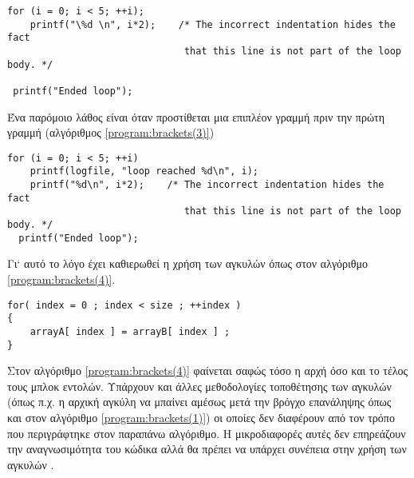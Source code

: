 \begin{lstlisting}[style=cpp, caption= Αγκύλες (2), label=program:brackets(2)]
 for (i = 0; i < 5; ++i);
    printf("\%d \n", i*2);    /* The incorrect indentation hides the fact 
                               that this line is not part of the loop body. */

 printf("Ended loop");
\end{lstlisting}

 
Ένα παρόμοιο λάθος είναι όταν προστίθεται μια επιπλέον γραμμή πριν την πρώτη γραμμή (αλγόριθμος \ref{program:brackets(3)})

\begin{lstlisting}[style=cpp, caption= Αγκύλες (3), label=program:brackets(3)]
 for (i = 0; i < 5; ++i)
    printf(logfile, "loop reached %d\n", i);
    printf("%d\n", i*2);    /* The incorrect indentation hides the fact 
                               that this line is not part of the loop body. */
  printf("Ended loop");
\end{lstlisting}

Γι` αυτό το λόγο έχει καθιερωθεί η χρήση των αγκυλών όπως στον αλγόριθμο \ref{program:brackets(4)}.

\begin{lstlisting}[style=cpp, caption= Αγκύλες (4), label=program:brackets(4)]
for( index = 0 ; index < size ; ++index )
{
    arrayA[ index ] = arrayB[ index ] ;
}
\end{lstlisting}

Στον αλγόριθμο \ref{program:brackets(4)} φαίνεται σαφώς τόσο η αρχή όσο και το τέλος τους μπλοκ εντολών. Υπάρχουν και άλλες μεθοδολογίες τοποθέτησης των αγκυλών (όπως π.χ. η αρχική αγκύλη να μπαίνει αμέσως μετά την βρόγχο επανάληψης όπως και στον αλγόριθμο \ref{program:brackets(1)}) οι οποίες δεν διαφέρουν από τον τρόπο που περιγράφτηκε στον παραπάνω αλγόριθμο. Η μικροδιαφορές αυτές δεν επηρεάζουν την αναγνωσιμότητα του κώδικα αλλά θα πρέπει να υπάρχει συνέπεια στην χρήση των αγκυλών \cite{sutter2004c++}.




